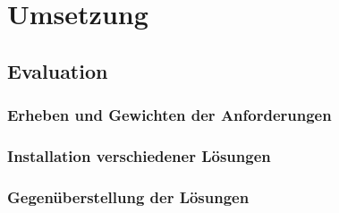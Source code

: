 
\clearpage
{}
\recalctypearea
\chapter{Umsetzung}
\section{Evaluation}

\clearpage
{}
\recalctypearea
\subsection{Erheben und Gewichten der Anforderungen}

%
%

\clearpage
{}
\recalctypearea
\subsection{Installation verschiedener Lösungen}








\clearpage
{}
\recalctypearea
\subsection{Gegenüberstellung der Lösungen}



